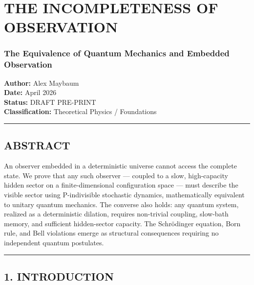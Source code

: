 \documentclass[
]{article}
\author{}
\date{}
\begin{document}
\hypertarget{the-incompleteness-of-observation}{%
\section{THE INCOMPLETENESS OF
OBSERVATION}\label{the-incompleteness-of-observation}}

\hypertarget{the-equivalence-of-quantum-mechanics-and-embedded-observation}{%
\subsubsection{The Equivalence of Quantum Mechanics and Embedded
Observation}\label{the-equivalence-of-quantum-mechanics-and-embedded-observation}}

\textbf{Author:} Alex Maybaum\\
\textbf{Date:} April 2026\\
\textbf{Status:} DRAFT PRE-PRINT\\
\textbf{Classification:} Theoretical Physics / Foundations

\begin{center}\rule{0.5\linewidth}{0.5pt}\end{center}

\hypertarget{abstract}{%
\subsection{ABSTRACT}\label{abstract}}

An observer embedded in a deterministic universe cannot access the
complete state. We prove that any such observer --- coupled to a slow,
high-capacity hidden sector on a finite-dimensional configuration space
--- must describe the visible sector using P-indivisible stochastic
dynamics, mathematically equivalent to unitary quantum mechanics. The
converse also holds: any quantum system, realized as a deterministic
dilation, requires non-trivial coupling, slow-bath memory, and
sufficient hidden-sector capacity. The Schrödinger equation, Born rule,
and Bell violations emerge as structural consequences requiring no
independent quantum postulates.

\begin{center}\rule{0.5\linewidth}{0.5pt}\end{center}

\hypertarget{introduction}{%
\subsection{1. INTRODUCTION}\label{introduction}}
\end{document}
